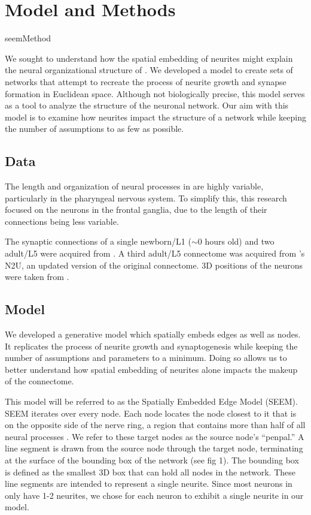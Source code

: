 \section{Model and Methods}

{seemMethod}

We sought to understand how the spatial embedding of neurites might explain the neural organizational structure of \ce. 
We developed a model to create sets of networks that attempt to recreate the process of neurite growth and synapse formation in Euclidean space. 
Although not biologically precise, this model serves as a tool to analyze the structure of the \ce neuronal network.
Our aim with this model is to examine how neurites impact the structure of a network while keeping the number of assumptions to as few as possible.

\subsection{Data}
The length and organization of neural processes in \ce are highly variable, particularly in the pharyngeal nervous system. 
To simplify this, this research focused on the neurons in the frontal ganglia, due to the length of their connections being less variable. 

The synaptic connections of a single newborn/L1 ($\sim 0$ hours old) and two adult/L5 \ce were acquired from \cite{Witvliet}.
A third adult/L5 connectome was acquired from \cite{Durbin}'s N2U, an updated version of the original \cite{White} connectome. 
3D positions of the neurons were taken from \cite{Skuhersky}. 

\subsection{Model}
We developed a generative model which spatially embeds edges as well as nodes. 
It replicates the process of neurite growth and synaptogenesis while keeping the number of assumptions and parameters to a minimum. 
Doing so allows us to better understand how spatial embedding of neurites alone impacts the makeup of the connectome.

This model will be referred to as the Spatially Embedded Edge Model (SEEM). 
SEEM iterates over every node. 
Each node locates the node closest to it that is on the opposite side of the nerve ring, a region that contains more than half of all neural processes \citep{Altun}. 
We refer to these target nodes as the source node's ``penpal.''
A line segment is drawn from the source node through the target node, terminating at the surface of the bounding box of the network (see fig 1). 
The bounding box is defined as the smallest 3D box that can hold all nodes in the network. 
These line segments are intended to represent a single neurite. 
Since most neurons in \ce only have 1-2 neurites, we chose for each neuron to exhibit a single neurite in our model.

